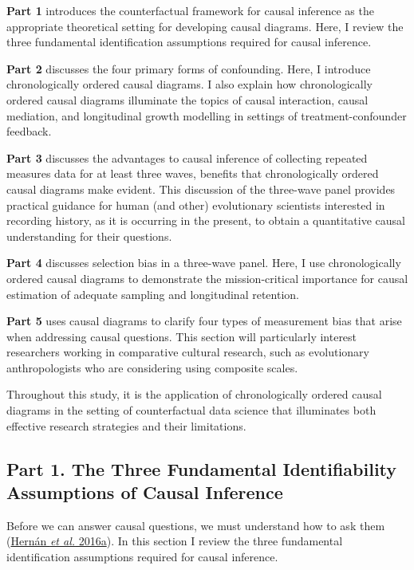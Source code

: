 \documentclass[
  singlecolumn]{article}
\begin{document}
\textbf{Part 1} introduces the counterfactual framework for causal
inference as the appropriate theoretical setting for developing causal
diagrams. Here, I review the three fundamental identification
assumptions required for causal inference.

\textbf{Part 2} discusses the four primary forms of confounding. Here, I
introduce chronologically ordered causal diagrams. I also explain how
chronologically ordered causal diagrams illuminate the topics of causal
interaction, causal mediation, and longitudinal growth modelling in
settings of treatment-confounder feedback.

\textbf{Part 3} discusses the advantages to causal inference of
collecting repeated measures data for at least three waves, benefits
that chronologically ordered causal diagrams make evident. This
discussion of the three-wave panel provides practical guidance for human
(and other) evolutionary scientists interested in recording history, as
it is occurring in the present, to obtain a quantitative causal
understanding for their questions.

\textbf{Part 4} discusses selection bias in a three-wave panel. Here, I
use chronologically ordered causal diagrams to demonstrate the
mission-critical importance for causal estimation of adequate sampling
and longitudinal retention.

\textbf{Part 5} uses causal diagrams to clarify four types of
measurement bias that arise when addressing causal questions. This
section will particularly interest researchers working in comparative
cultural research, such as evolutionary anthropologists who are
considering using composite scales.

Throughout this study, it is the application of chronologically ordered
causal diagrams in the setting of counterfactual data science that
illuminates both effective research strategies and their limitations.

\hypertarget{part-1.-the-three-fundamental-identifiability-assumptions-of-causal-inference}{%
\subsection{Part 1. The Three Fundamental Identifiability Assumptions of
Causal
Inference}\label{part-1.-the-three-fundamental-identifiability-assumptions-of-causal-inference}}

Before we can answer causal questions, we must understand how to ask
them (\protect\hyperlink{ref-hernuxe1n2016}{Hernán \emph{et al.}
2016a}). In this section I review the three fundamental identification
assumptions required for causal inference.
\end{document}
